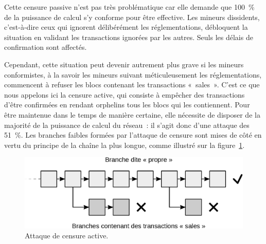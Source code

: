 Cette censure passive n'est pas très problématique car elle demande que 100~\% de la puissance de calcul s'y conforme pour être effective. Les mineurs dissidents, c'est-à-dire ceux qui ignorent délibérément les réglementations, débloquent la situation en validant les transactions ignorées par les autres. Seuls les délais de confirmation sont affectés.

Cependant, cette situation peut devenir autrement plus grave si les mineurs conformistes, à la savoir les mineurs suivant méticuleusement les réglementations, commencent à refuser les blocs contenant les transactions «~sales~». C'est ce que nous appelons ici la censure active, qui consiste à empêcher des transactions d'être confirmées en rendant orphelins tous les blocs qui les contiennent. Pour être maintenue dans le temps de manière certaine, elle nécessite de disposer de la majorité de la puissance de calcul du réseau~: il s'agit donc d'une attaque des 51~\%. Les branches faibles formées par l'attaque de censure sont mises de côté en vertu du principe de la chaîne la plus longue, comme illustré sur la figure~\ref{fig:censorship-attack}.

\begin{figure}[h]
  \centering
  \includegraphics[scale=0.7]{img/mining-attack-censorship.eps}
  \caption{Attaque de censure active.}
  \label{fig:censorship-attack}
\end{figure}



